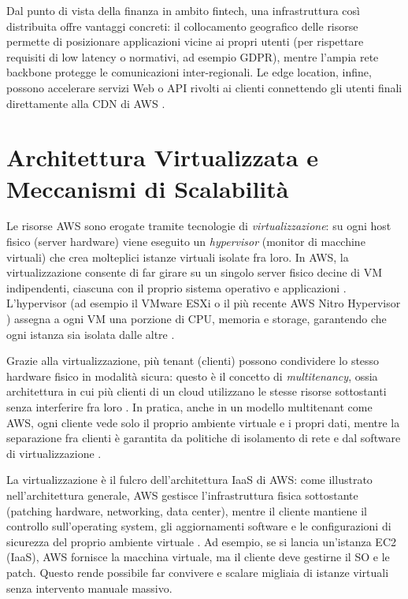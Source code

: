 \documentclass[a4paper,12pt]{report}
\begin{document}
Dal punto di vista della finanza in ambito fintech, una infrastruttura così distribuita offre vantaggi concreti: il collocamento geografico delle risorse permette di posizionare applicazioni vicine ai propri utenti (per rispettare requisiti di low latency o normativi, ad esempio GDPR), mentre l’ampia rete backbone protegge le comunicazioni inter-regionali. Le edge location, infine, possono accelerare servizi Web o API rivolti ai clienti connettendo gli utenti finali direttamente alla CDN di AWS \cite{aws-cloudfront}.

\section{Architettura Virtualizzata e Meccanismi di Scalabilità}
Le risorse AWS sono erogate tramite tecnologie di \textit{virtualizzazione}: su ogni host fisico (server hardware) viene eseguito un \textit{hypervisor} (monitor di macchine virtuali) che crea molteplici istanze virtuali isolate fra loro. In AWS, la virtualizzazione consente di far girare su un singolo server fisico decine di VM indipendenti, ciascuna con il proprio sistema operativo e applicazioni \cite{ibm_iaas}. L’hypervisor (ad esempio il VMware ESXi o il più recente AWS Nitro Hypervisor \cite{aws-nitro-hypervisor}) assegna a ogni VM una porzione di CPU, memoria e storage, garantendo che ogni istanza sia isolata dalle altre \cite{ibm_iaas}.

Grazie alla virtualizzazione, più tenant (clienti) possono condividere lo stesso hardware fisico in modalità sicura: questo è il concetto di \textit{multitenancy}, ossia architettura in cui più clienti di un cloud utilizzano le stesse risorse sottostanti senza interferire fra loro \cite{nist800-145}. In pratica, anche in un modello multitenant come AWS, ogni cliente vede solo il proprio ambiente virtuale e i propri dati, mentre la separazione fra clienti è garantita da politiche di isolamento di rete e dal software di virtualizzazione \cite{nist800-145}.

La virtualizzazione è il fulcro dell’architettura IaaS di AWS: come illustrato nell’architettura generale, AWS gestisce l’infrastruttura fisica sottostante (patching hardware, networking, data center), mentre il cliente mantiene il controllo sull’operating system, gli aggiornamenti software e le configurazioni di sicurezza del proprio ambiente virtuale \cite{aws-well-architected}. Ad esempio, se si lancia un’istanza EC2 (IaaS), AWS fornisce la macchina virtuale, ma il cliente deve gestirne il SO e le patch. Questo rende possibile far convivere e scalare migliaia di istanze virtuali senza intervento manuale massivo.
\end{document}
